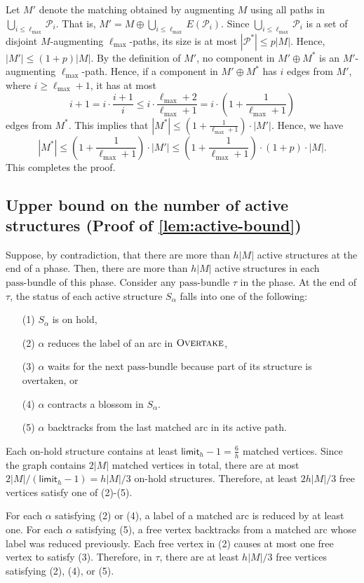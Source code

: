 \documentclass{article}
\newcommand{\alp}{\alpha}
\newcommand{\lmax}{\ell_{\max}}
\newcommand{\calP}{\mathcal{P}}
\newcommand{\bundle}{\text{pass-bundle}\xspace}
\newcommand{\limit}{\mathsf{limit}}
\newcommand{\algOvertake}{\textsc{Overtake}\xspace}
\newcommand{\rb}[1]{\left( #1 \right)}
\begin{document}
Let $M'$ denote the matching obtained by augmenting $M$ using all paths in $\bigcup_{i \leq \lmax} \calP_i$.
That is, $M' = M \oplus \bigcup_{i \leq \lmax} E(\calP_i)$.
Since $\bigcup_{i \leq \lmax} \calP_i$ is a set of disjoint $M$-augmenting $\lmax$-paths, its size is at most $|\calP^*| \leq p|M|$.
Hence, $|M'| \leq (1 + p)|M|$.
By the definition of $M'$, no component in $M' \oplus M^*$ is an $M'$-augmenting $\lmax$-path.
Hence, if a component in $M' \oplus M^*$ has $i$ edges from $M'$, where $i \geq \lmax + 1$, it has at most
\[
    i+1 = i \cdot \frac{i+1}{i} \leq i \cdot \frac{\lmax+2}{\lmax+1} = i \cdot \rb{1 + \frac{1}{\lmax+1}}
\]
edges from $M^*$. This implies that $|M^*| \leq \rb{1 + \frac{1}{\lmax+1}} \cdot |M'|$.
Hence, we have
\[
    |M^*| \leq \rb{1 + \frac{1}{\lmax+1}} \cdot |M'| \leq \rb{1 + \frac{1}{\lmax+1}} \cdot (1+p) \cdot |M|.
\]
This completes the proof.


\subsection{Upper bound on the number of active structures (Proof of \cref{lem:active-bound})}
\label{sec:proof-active-bound}
Suppose, by contradiction, that there are more than $h|M|$ active structures at the end of a phase.
Then, there are more than $h|M|$ active structures in each $\bundle$ of this phase.
Consider any $\bundle$ $\tau$ in the phase.
At the end of $\tau$, the status of each active structure $S_\alp$ falls into one of the following:
\begin{itemize}
    \item[(1)] $S_\alp$ is on hold,
    \item[(2)] $\alp$ reduces the label of an arc in $\algOvertake$,
    \item[(3)] $\alp$ waits for the next $\bundle$ because part of its structure is overtaken, or
    \item[(4)] $\alp$ contracts a blossom in $S_\alp$.
    \item[(5)] $\alp$ backtracks from the last matched arc in its active path.
\end{itemize}
Each on-hold structure contains at least $\limit_h - 1 = \frac{6}{h}$ matched vertices.
Since the graph contains $2|M|$ matched vertices in total, there are at most $2|M|/(\limit_h - 1) = h|M|/3$ on-hold structures.
Therefore, at least $2h|M|/3$ free vertices satisfy one of (2)-(5).

For each $\alp$ satisfying (2) or (4), a label of a matched arc is reduced by at least one.
For each $\alp$ satisfying (5), a free vertex backtracks from a matched arc whose label was reduced previously.
Each free vertex in (2) causes at most one free vertex to satisfy (3).
Therefore, in $\tau$, there are at least $h|M|/3$ free vertices satisfying (2), (4), or (5).
\end{document}
